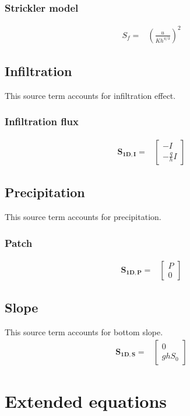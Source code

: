 \subsubsection{Strickler model}
\begin{align}
S_f = & \left(\frac{u}{Kh^{4/3}}\right)^2
\end{align}

\subsection{Infiltration}
This source term accounts for infiltration effect.
\subsubsection{Infiltration flux}
\begin{align}
\mathbf{S_{1D,I}} = & \left[\begin{array}{c} -I \\ - \displaystyle{\frac{q}{h}} I \end{array}\right]
\end{align}

\subsection{Precipitation}
This source term accounts for precipitation.
\subsubsection{Patch}
\begin{align}
\mathbf{S_{1D,P}} = & \left[\begin{array}{c} P \\ 0 \end{array}\right]
\end{align}

\subsection{Slope}
This source term accounts for bottom slope.
\begin{align}
\mathbf{S_{1D,S}} = & \left[\begin{array}{c} 0 \\ gh S_0 \end{array}\right]
\end{align}

\section{Extended equations}
